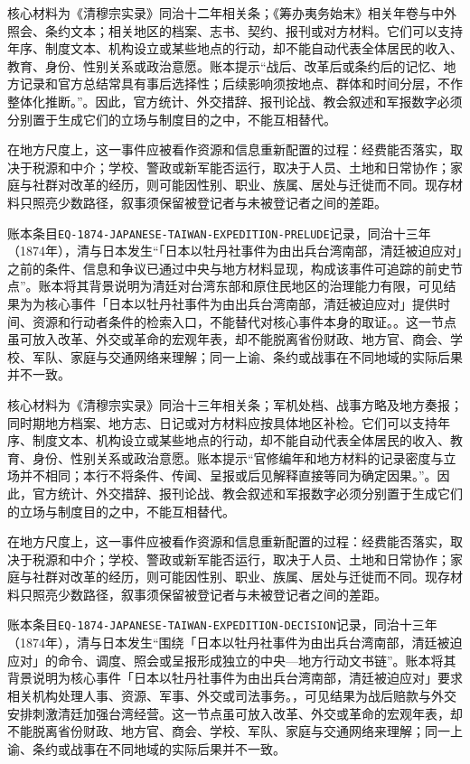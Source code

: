 核心材料为《清穆宗实录》同治十二年相关条；《筹办夷务始末》相关年卷与中外照会、条约文本；相关地区的档案、志书、契约、报刊或对方材料。它们可以支持年序、制度文本、机构设立或某些地点的行动，却不能自动代表全体居民的收入、教育、身份、性别关系或政治意愿。账本提示“战后、改革后或条约后的记忆、地方记录和官方总结常具有事后选择性；后续影响须按地点、群体和时间分层，不作整体化推断。”。因此，官方统计、外交措辞、报刊论战、教会叙述和军报数字必须分别置于生成它们的立场与制度目的之中，不能互相替代。

在地方尺度上，这一事件应被看作资源和信息重新配置的过程：经费能否落实，取决于税源和中介；学校、警政或新军能否运行，取决于人员、土地和日常协作；家庭与社群对改革的经历，则可能因性别、职业、族属、居处与迁徙而不同。现存材料只照亮少数路径，叙事须保留被登记者与未被登记者之间的差距。

账本条目\texttt{EQ-1874-JAPANESE-TAIWAN-EXPEDITION-PRELUDE}记录，同治十三年（1874年），清与日本发生“「日本以牡丹社事件为由出兵台湾南部，清廷被迫应对」之前的条件、信息和争议已通过中央与地方材料显现，构成该事件可追踪的前史节点”。账本将其背景说明为清廷对台湾东部和原住民地区的治理能力有限，可见结果为为核心事件「日本以牡丹社事件为由出兵台湾南部，清廷被迫应对」提供时间、资源和行动者条件的检索入口，不能替代对核心事件本身的取证。。这一节点虽可放入改革、外交或革命的宏观年表，却不能脱离省份财政、地方官、商会、学校、军队、家庭与交通网络来理解；同一上谕、条约或战事在不同地域的实际后果并不一致。

核心材料为《清穆宗实录》同治十三年相关条；军机处档、战事方略及地方奏报；同时期地方档案、地方志、日记或对方材料应按具体地区补检。它们可以支持年序、制度文本、机构设立或某些地点的行动，却不能自动代表全体居民的收入、教育、身份、性别关系或政治意愿。账本提示“官修编年和地方材料的记录密度与立场并不相同；本行不将条件、传闻、呈报或后见解释直接等同为确定因果。”。因此，官方统计、外交措辞、报刊论战、教会叙述和军报数字必须分别置于生成它们的立场与制度目的之中，不能互相替代。

在地方尺度上，这一事件应被看作资源和信息重新配置的过程：经费能否落实，取决于税源和中介；学校、警政或新军能否运行，取决于人员、土地和日常协作；家庭与社群对改革的经历，则可能因性别、职业、族属、居处与迁徙而不同。现存材料只照亮少数路径，叙事须保留被登记者与未被登记者之间的差距。

账本条目\texttt{EQ-1874-JAPANESE-TAIWAN-EXPEDITION-DECISION}记录，同治十三年（1874年），清与日本发生“围绕「日本以牡丹社事件为由出兵台湾南部，清廷被迫应对」的命令、调度、照会或呈报形成独立的中央—地方行动文书链”。账本将其背景说明为核心事件「日本以牡丹社事件为由出兵台湾南部，清廷被迫应对」要求相关机构处理人事、资源、军事、外交或司法事务。，可见结果为战后赔款与外交安排刺激清廷加强台湾经营。这一节点虽可放入改革、外交或革命的宏观年表，却不能脱离省份财政、地方官、商会、学校、军队、家庭与交通网络来理解；同一上谕、条约或战事在不同地域的实际后果并不一致。

